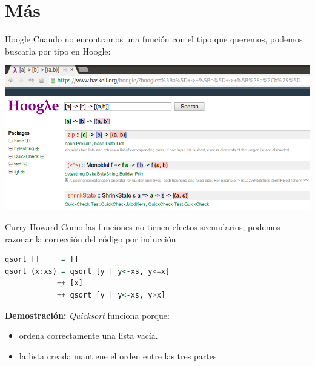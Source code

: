 \section{Más}

\begin{frame}[fragile]{Hoogle}
  Cuando no encontramos una función con el tipo que queremos, podemos
  buscarla por tipo en Hoogle:
  
  \begin{center}
  \includegraphics[scale=0.35]{./images/hoogle.png}
  \end{center}
\end{frame}


\begin{frame}[fragile]{Curry-Howard}
  Como las funciones no tienen efectos secundarios, podemos razonar la
  corrección del código por inducción:

  \begin{lstlisting}[language=haskell]
qsort []     = []
qsort (x:xs) = qsort [y | y<-xs, y<=x]
            ++ [x]
            ++ qsort [y | y<-xs, y>x]
  \end{lstlisting}

  \textbf{Demostración:} \textit{Quicksort} funciona porque:
  \begin{itemize}
   \item ordena correctamente una lista vacía.
   \item la lista creada mantiene el orden entre las tres partes
  \end{itemize}
\end{frame}


